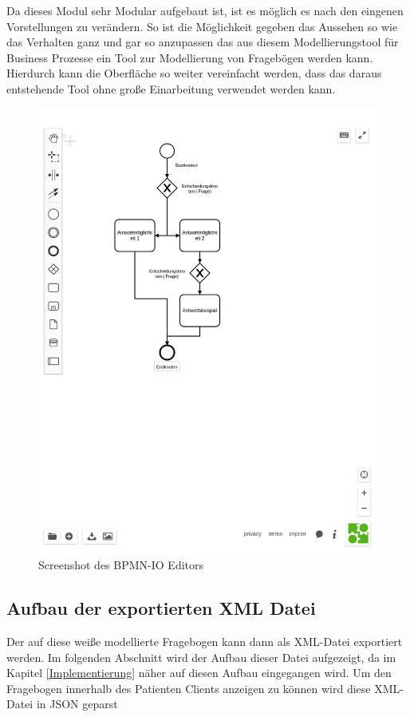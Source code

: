 Da dieses Modul sehr Modular aufgebaut ist, ist es möglich es nach den eingenen Vorstellungen zu verändern. So ist die Möglichkeit gegeben das Aussehen so wie das  Verhalten ganz und gar so anzupassen das aus diesem Modellierungstool für Business Prozesse ein Tool zur Modellierung von Fragebögen werden kann. Hierdurch kann die Oberfläche so weiter vereinfacht werden, dass das daraus entstehende Tool ohne große Einarbeitung verwendet werden kann.

\begin{figure}[H]
	\centering
	\includegraphics[scale=0.5]{images/BPMNEditorBSP}
	\caption[Screenshot des BPMN-IO Editors]{Screenshot des BPMN-IO Editors}
	\label{BPMNEditorBSP}
\end{figure}



\subsection{Aufbau der exportierten XML Datei}
Der auf diese weiße modellierte Fragebogen kann dann als XML-Datei exportiert werden. Im folgenden Abschnitt wird der Aufbau dieser Datei aufgezeigt, da im Kapitel \ref{Implementierung} näher auf diesen Aufbau eingegangen wird. Um den Fragebogen innerhalb des Patienten Clients anzeigen zu können wird diese XML-Datei in JSON geparst

